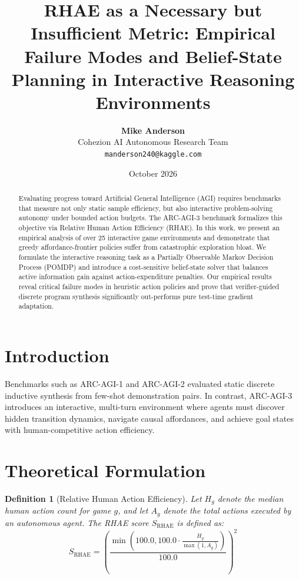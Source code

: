 \documentclass[11pt,twocolumn]{article}
\title{\textbf{RHAE as a Necessary but Insufficient Metric: Empirical Failure Modes and Belief-State Planning in Interactive Reasoning Environments}}
\author{
  \textbf{Mike Anderson} \\
  Cohezion AI Autonomous Research Team \\
  \texttt{manderson240@kaggle.com}
}
\date{October 2026}
\newtheorem{definition}{Definition}
\begin{document}
\maketitle

\begin{abstract}
Evaluating progress toward Artificial General Intelligence (AGI) requires benchmarks that measure not only static sample efficiency, but also interactive problem-solving autonomy under bounded action budgets. The ARC-AGI-3 benchmark formalizes this objective via Relative Human Action Efficiency (RHAE). In this work, we present an empirical analysis of over 25 interactive game environments and demonstrate that greedy affordance-frontier policies suffer from catastrophic exploration bloat. We formulate the interactive reasoning task as a Partially Observable Markov Decision Process (POMDP) and introduce a cost-sensitive belief-state solver that balances active information gain against action-expenditure penalties. Our empirical results reveal critical failure modes in heuristic action policies and prove that verifier-guided discrete program synthesis significantly out-performs pure test-time gradient adaptation.
\end{abstract}

\section{Introduction}
Benchmarks such as ARC-AGI-1 and ARC-AGI-2 evaluated static discrete inductive synthesis from few-shot demonstration pairs. In contrast, ARC-AGI-3 introduces an interactive, multi-turn environment where agents must discover hidden transition dynamics, navigate causal affordances, and achieve goal states with human-competitive action efficiency.

\section{Theoretical Formulation}

\begin{definition}[Relative Human Action Efficiency]
Let $H_g$ denote the median human action count for game $g$, and let $A_g$ denote the total actions executed by an autonomous agent. The RHAE score $S_{\text{RHAE}}$ is defined as:
\begin{equation}
S_{\text{RHAE}} = \left( \frac{\min(100.0, 100.0 \cdot \frac{H_g}{\max(1, A_g)})}{100.0} \right)^2
\end{equation}
\end{definition}
\end{document}
